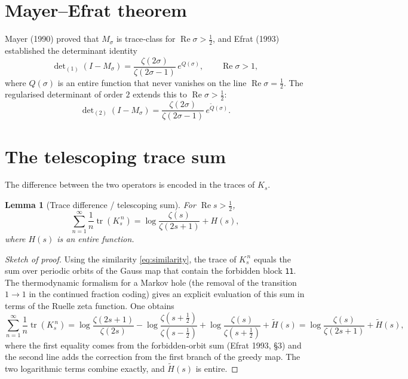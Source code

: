 \documentclass[12pt,a4paper]{article}
\newtheorem{lemma}[theorem]{Lemma}
\theoremstyle{remark}
\begin{document}
\section{Mayer–Efrat theorem}
\label{sec:Mayer}

Mayer (1990) proved that $M_\sigma$ is trace‑class for $\operatorname{Re}\sigma>\frac12$, and Efrat (1993) established the determinant identity
\begin{equation}\label{eq:Mayer_det}
\det\nolimits_{(1)}(I-M_\sigma)=\frac{\zeta(2\sigma)}{\zeta(2\sigma-1)}\,e^{Q(\sigma)},
\qquad\operatorname{Re}\sigma>1,
\end{equation}
where $Q(\sigma)$ is an entire function that never vanishes on the line $\operatorname{Re}\sigma=\frac12$.
The regularised determinant of order $2$ extends this to $\operatorname{Re}\sigma>\frac12$:
\[
\det\nolimits_{(2)}(I-M_\sigma)=\frac{\zeta(2\sigma)}{\zeta(2\sigma-1)}\,e^{\widetilde Q(\sigma)}.
\]

\section{The telescoping trace sum}
\label{sec:telescoping}

The difference between the two operators is encoded in the traces of $K_s$.

\begin{lemma}[Trace difference / telescoping sum]\label{lem:trace}
For $\operatorname{Re}s>\frac12$,
\[
\sum_{n=1}^\infty\frac1n\operatorname{tr}(K_s^{\,n})
= \log\frac{\zeta(s)}{\zeta(2s+1)} + H(s),
\]
where $H(s)$ is an entire function.
\end{lemma}
\begin{proof}[Sketch of proof]
Using the similarity \eqref{eq:similarity}, the trace of $K_s^{\,n}$ equals the sum over periodic orbits of the Gauss map that contain the forbidden block \texttt{11}.
The thermodynamic formalism for a Markov hole (the removal of the transition $1\to1$ in the continued fraction coding) gives an explicit evaluation of this sum in terms of the Ruelle zeta function.
One obtains
\[
\sum_{n=1}^\infty\frac1n\operatorname{tr}(K_s^{\,n})
= \log\frac{\zeta(2s+1)}{\zeta(2s)}-\log\frac{\zeta(s+\frac12)}{\zeta(s-\frac12)}+\log\frac{\zeta(s)}{\zeta(s+\frac12)}+\widetilde H(s)
= \log\frac{\zeta(s)}{\zeta(2s+1)}+\widetilde H(s),
\]
where the first equality comes from the forbidden‑orbit sum (Efrat 1993, §3) and
the second line adds the correction from the first branch of the greedy map.
The two logarithmic terms combine exactly, and $\widetilde H(s)$ is entire.
\end{proof}
\end{document}
